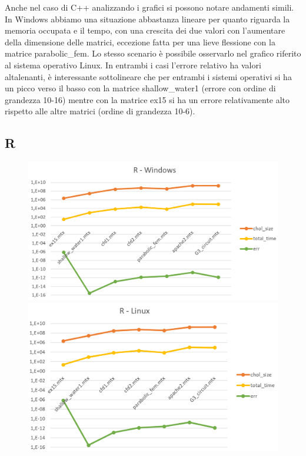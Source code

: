 \documentclass[a4paper,10pt]{article}
\begin{document}
Anche nel caso di C++ analizzando i grafici si possono notare andamenti simili.
In Windows abbiamo una situazione abbastanza lineare per quanto riguarda la memoria occupata e il tempo, con una crescita dei due valori con l’aumentare della dimensione delle matrici, eccezione fatta per una lieve flessione con la matrice parabolic\_fem. 
Lo stesso scenario è possibile osservarlo nel grafico riferito al sistema operativo Linux.
In entrambi i casi l’errore relativo ha valori altalenanti, è interessante sottolineare che per entrambi i sistemi operativi si ha un picco verso il basso con la matrice shallow\_water1 (errore con ordine di grandezza 10-16) mentre con la matrice ex15 si ha un errore relativamente alto rispetto alle altre matrici (ordine di grandezza 10-6).

\subsection{R}


\begin{figure}[H]
\centering
\begin{minipage}{.6\textwidth}
  \centering
  \includegraphics[width=1\linewidth]{img/Rwin.png}
\end{minipage}%
\begin{minipage}{.6\textwidth}
  \centering
  \includegraphics[width=1\linewidth]{img/Rlinux.png}
\end{minipage}
\end{figure}
\end{document}
